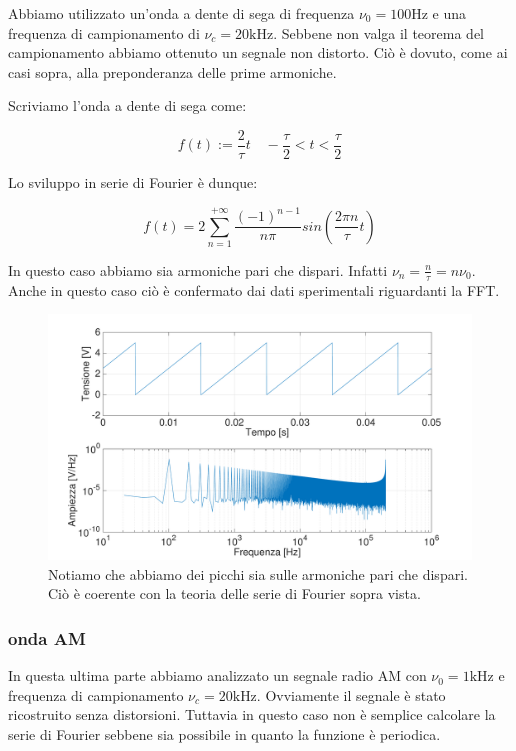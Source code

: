 Abbiamo utilizzato un'onda a dente di sega di frequenza $\nu_0=100 \si{\hertz}$ e una frequenza di campionamento di $\nu_c=20\si{\kilo\hertz}$. Sebbene non valga il teorema del campionamento abbiamo ottenuto un segnale non distorto. Ciò è dovuto, come ai casi sopra, alla preponderanza delle prime armoniche.

Scriviamo l'onda a dente di sega come: 

$$f(t):= \frac{2}{\tau}t \quad -\frac{\tau}{2}<t<\frac{\tau}{2}$$

Lo sviluppo in serie di Fourier è dunque:

\begin{equation}
f(t)=2\sum_{n=1}^{+\infty}\frac{(-1)^{n-1}}{n\pi}sin (\frac{2\pi n}{\tau}t)
\end{equation}


In questo caso abbiamo sia armoniche pari che dispari. Infatti $\nu_n=\frac{n}{\tau}=n\nu_0$. Anche in questo caso ciò è confermato dai dati sperimentali riguardanti la FFT. 

\begin{figure}[H]
\centering
	\includegraphics[width=.73\textwidth]{../E13/latex/sega100hz@10000,200000.pdf}
	\caption{Notiamo che abbiamo dei picchi sia sulle armoniche pari che dispari. Ciò è coerente con la teoria delle serie di Fourier sopra vista.}
	\label{sega}
\end{figure}

\subsubsection{onda AM}

In questa ultima parte abbiamo analizzato un segnale radio AM con $\nu_0=1\si{\kilo\hertz}$ e frequenza di campionamento $\nu_c=20\si{\kilo\hertz}$. Ovviamente il segnale è stato ricostruito senza distorsioni. Tuttavia in questo caso non è semplice calcolare la serie di Fourier sebbene sia possibile in quanto la funzione è periodica. 


